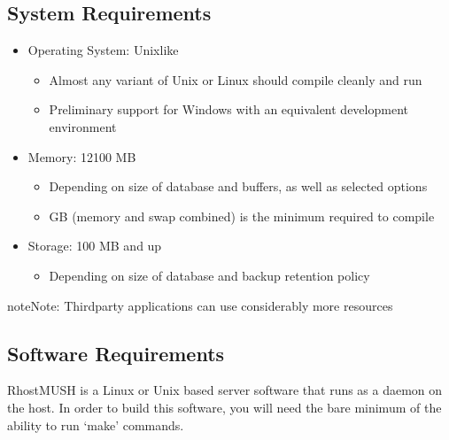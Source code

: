 \documentclass[letterpaper,10pt,english]{sphinxmanual}
\begin{document}
\subsection{System Requirements}
\label{\detokenize{install:system-requirements}}\label{\detokenize{install:id3}}\begin{itemize}
\item {} 
\sphinxAtStartPar
Operating System: Unix\sphinxhyphen{}like
\begin{itemize}
\item {} 
\sphinxAtStartPar
Almost any variant of Unix or Linux should compile cleanly and run

\item {} 
\sphinxAtStartPar
Preliminary support for Windows with an equivalent development environment

\end{itemize}

\item {} 
\sphinxAtStartPar
Memory: 12\sphinxhyphen{}100 MB
\begin{itemize}
\item {} 
\sphinxAtStartPar
Depending on size of database and buffers, as well as selected options

\item {} 
 GB (memory and swap combined) is the minimum required to compile

\end{itemize}

\item {} 
\sphinxAtStartPar
Storage: 100 MB and up
\begin{itemize}
\item {} 
\sphinxAtStartPar
Depending on size of database and backup retention policy

\end{itemize}

\end{itemize}

\begin{sphinxadmonition}{note}{Note:}
\sphinxAtStartPar
Third\sphinxhyphen{}party applications can use considerably more resources
\end{sphinxadmonition}


\subsection{Software Requirements}
\label{\detokenize{install:software-requirements}}\label{\detokenize{install:id4}}
\sphinxAtStartPar
RhostMUSH is a Linux or Unix based server software that runs as a daemon on the host.
In order to build this software, you will need the bare minimum of the ability to run ‘make’ commands.
\end{document}
